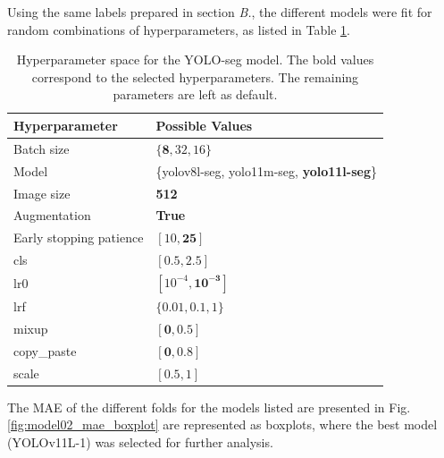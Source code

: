 \documentclass[conference]{IEEEtran}
\begin{document}
Using the same labels prepared in section \textit{B.}, the different models were fit for random combinations of hyperparameters, as  listed in Table \ref{parametrosseg}.



\begin{table}[H]
\centering
\caption{Hyperparameter space for the YOLO-seg model. The
bold values correspond to the selected hyperparameters. The remaining parameters are left as default.}
\label{parametrosseg}
\begin{tabular}{ll}
\toprule
\textbf{Hyperparameter} & \textbf{Possible Values} \\
\midrule
Batch size & $\{\mathbf{8}, 32, 16\}$ \\
Model & \{yolov8l-seg, yolo11m-seg, \textbf{yolo11l-seg}\} \\
Image size & \textbf{512} \\
Augmentation & \textbf{True} \\
Early stopping patience & $[10, \mathbf{25}]$ \\
cls & $[\mathbf{0.5}, 2.5]$ \\
lr0 & $[10^{-4}, \mathbf{10^{-3}}]$ \\
lrf & $\{0.01, \mathbf{0.1}, 1\}$ \\
mixup & $[\mathbf{0}, 0.5]$ \\
copy\_paste & $[\mathbf{0}, 0.8]$ \\
scale & $[\mathbf{0.5}, 1]$ \\
\bottomrule
\end{tabular}
\end{table}

The MAE of the different folds for the models listed are presented in Fig. \ref{fig:model02_mae_boxplot} are represented as boxplots, where the best model (YOLOv11L-1) was selected for further analysis.
\end{document}
